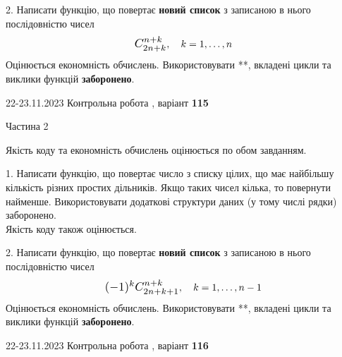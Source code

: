 \documentclass[12pt, ukrainian]{article}
\begin{document}
{{{{{{{{{{{{{{\begin {Large}
\vspace{10mm}



2. 
Написати функцію, що повертає \textbf{новий список} з записаною в нього послідовністю чисел
$$\scalebox{1.2}{$C_{2n+k}^{n+k}$}, \quad k=1,\ldots,n$$
Оцінюється економність обчислень. Використовувати **, вкладені цикли та виклики функцій \textbf{заборонено}.

\end{Large}\newpage




\begin {Huge}
{{22-23.11.2023 Контрольна робота , варіант  \No \textbf { 115 }\par}}

\begin{center}Частина 2
\end{center}
\vspace{10mm}
\end {Huge}

{
\begin {Large}
Якість коду та економність обчислень оцінюється по обом завданням.

\vspace{5mm}

1. Написати функцію, що повертає число з списку цілих, що має найбільшу кількість різних простих дільників. Якщо таких чисел кілька, то повернути найменше. Використовувати додаткові структури даних (у тому числі рядки) заборонено.\\	Якість коду також оцінюється. 



\vspace{10mm}



2. 
Написати функцію, що повертає \textbf{новий список} з записаною в нього послідовністю чисел
$$\scalebox{1.2}{$(-1)^{k}C_{2n+k+1}^{n+k}$}, \quad k=1,\ldots,n-1$$
Оцінюється економність обчислень. Використовувати **, вкладені цикли та виклики функцій \textbf{заборонено}.

\end{Large}\newpage




\begin {Huge}
{{22-23.11.2023 Контрольна робота , варіант  \No \textbf { 116 }\par}}


\end{Huge}}}}}}}}}}}}}}}}
\end{document}
